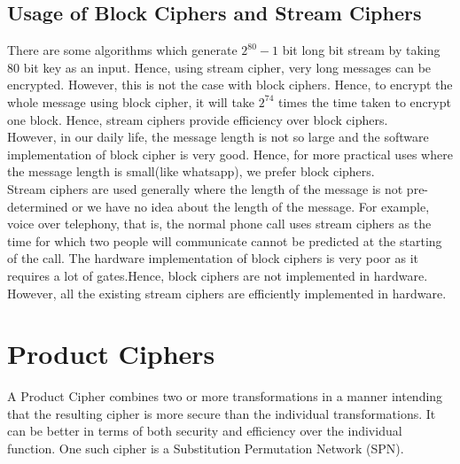 \documentclass[11pt]{article}
\begin{document}
\subsection{Usage of Block Ciphers and Stream Ciphers}
There are some algorithms which generate $2^{80} - 1$ bit long bit stream by taking 80 bit key as an input. Hence, using stream cipher, very long messages can be encrypted. However, this is not the case with block ciphers. Hence, to encrypt the whole message using block cipher, it will take $2^{74}$ times the time taken to encrypt one block. Hence, stream ciphers provide efficiency over block ciphers.\\
\newline
However, in our daily life, the message length is not so large and the software implementation of block cipher is very good. Hence, for more practical uses where the message length is small(like whatsapp), we prefer block ciphers.\\
Stream ciphers are used generally where the length of the message is not pre-determined or we have no idea about the length of the message. For example, voice over telephony, that is, the normal phone call uses stream ciphers as the time for which two people will communicate cannot be predicted at the starting of the call.
\newline
The hardware implementation of block ciphers is very poor as it requires a lot of gates.Hence, block ciphers are not implemented in hardware. However, all the existing stream ciphers are efficiently implemented in hardware.
\section{Product Ciphers}
A Product Cipher combines two or more transformations in a manner intending that the resulting cipher is more secure than the individual transformations. It can be better in terms of both security and efficiency over the individual function. One such cipher is a Substitution Permutation Network (SPN).
\end{document}
